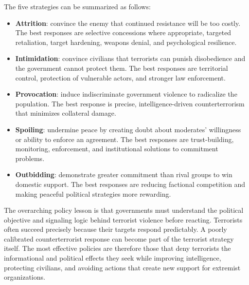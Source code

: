 The five strategies can be summarized as follows:

\begin{itemize}
    \item \textbf{Attrition}: convince the enemy that continued resistance will be too costly. The best responses are selective concessions where appropriate, targeted retaliation, target hardening, weapons denial, and psychological resilience.
    \item \textbf{Intimidation}: convince civilians that terrorists can punish disobedience and the government cannot protect them. The best responses are territorial control, protection of vulnerable actors, and stronger law enforcement.
    \item \textbf{Provocation}: induce indiscriminate government violence to radicalize the population. The best response is precise, intelligence-driven counterterrorism that minimizes collateral damage.
    \item \textbf{Spoiling}: undermine peace by creating doubt about moderates' willingness or ability to enforce an agreement. The best responses are trust-building, monitoring, enforcement, and institutional solutions to commitment problems.
    \item \textbf{Outbidding}: demonstrate greater commitment than rival groups to win domestic support. The best responses are reducing factional competition and making peaceful political strategies more rewarding.
\end{itemize}

The overarching policy lesson is that governments must understand the political objective and signaling logic behind terrorist violence before reacting. Terrorists often succeed precisely because their targets respond predictably. A poorly calibrated counterterrorist response can become part of the terrorist strategy itself. The most effective policies are therefore those that deny terrorists the informational and political effects they seek while improving intelligence, protecting civilians, and avoiding actions that create new support for extremist organizations.
